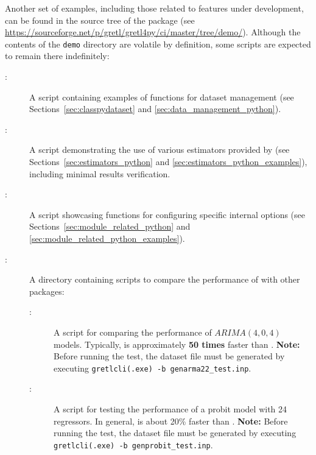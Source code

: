 Another set of examples, including those related to features
under development, can be found in the source tree of the
\gretlpy package (see
\url{https://sourceforge.net/p/gretl/gretl4py/ci/master/tree/demo/}).
Although the contents of the \texttt{demo} directory are
volatile by definition, some scripts are expected to remain
there indefinitely:

\begin{description}
	\item[:] A script containing
		examples of functions for dataset management (see
		Sections~\ref{sec:classpydataset} and
		\ref{sec:data_management_python}).
	\item[:] A script demonstrating
		the use of various estimators provided by \gretlpy
		(see Sections~\ref{sec:estimators_python} and
		\ref{sec:estimators_python_examples}), including
		minimal results verification.
	\item[:] A script
		showcasing functions for configuring specific \gretlpy
		internal options (see Sections~\ref{sec:module_related_python}
		and \ref{sec:module_related_python_examples}).
	\item[:] A directory containing scripts
		to compare the performance of \gretlpy with other
		\python packages:
		\begin{description}
			\item[:] A script for
				comparing the performance of $ARIMA(4,0,4)$
				models. Typically, \gretlpy is approximately
				\textbf{50 times} faster than .\newline
				\textbf{Note:} Before running the test, the dataset
				file must be generated by executing
				\texttt{gretlcli(.exe) -b genarma22\_test.inp}.
			\item[:] A script for testing
				the performance of a probit model with 24 regressors.
				In general, \gretlpy is about 20\% faster than
				.\newline
				\textbf{Note:} Before running the test, the dataset
				file must be generated by executing
				\texttt{gretlcli(.exe) -b genprobit\_test.inp}.
	\end{description}
\end{description}
